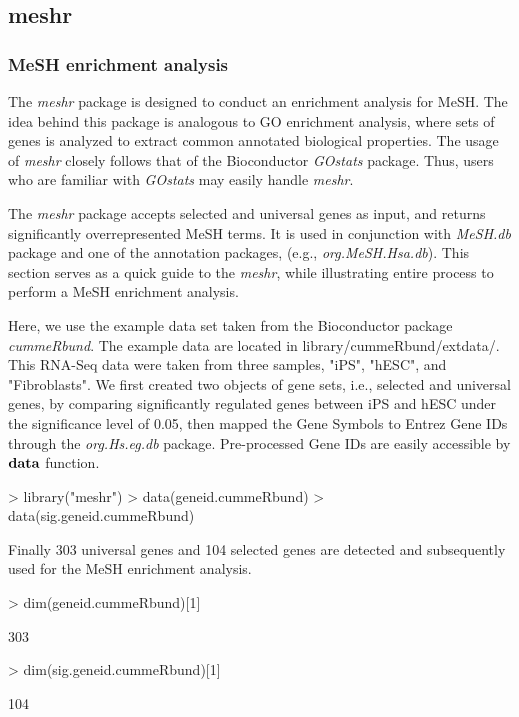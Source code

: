 \documentclass[11pt]{article}
\newcommand{\Rpackage}[1]{{\textit{#1}}}
\begin{document}
\clearpage
\subsection{meshr}
\subsubsection{MeSH enrichment analysis}
The \Rpackage{meshr} package is designed to conduct an enrichment analysis for MeSH.  The idea behind this package is analogous to GO enrichment analysis, where sets of genes is analyzed to extract common annotated biological properties. The usage of \Rpackage{meshr} closely follows that of the Bioconductor \Rpackage{GOstats} package. Thus, users who are familiar with \Rpackage{GOstats} may easily handle \Rpackage{meshr}.

The \Rpackage{meshr} package accepts selected and universal genes as input, and returns significantly overrepresented MeSH terms. It is used in conjunction with \Rpackage{MeSH.db} package and one of the annotation packages, (e.g., \Rpackage{org.MeSH.Hsa.db}). This section serves as a quick guide to the \Rpackage{meshr}, while illustrating entire process to perform a MeSH enrichment analysis.

Here, we use the example data set taken from the Bioconductor package \Rpackage{cummeRbund}. The example data are located in library/cummeRbund/extdata/. This RNA-Seq data were taken from three samples, "iPS", "hESC", and  "Fibroblasts".
We first created two objects of gene sets, i.e., selected and universal genes,
by comparing significantly regulated genes between iPS and hESC under the significance level of 0.05, then mapped the Gene Symbols to Entrez Gene IDs through the \Rpackage{org.Hs.eg.db} package. Pre-processed Gene IDs are easily accessible by $\bf{data}$ function.

\begin{center}
\begin{Schunk}
\begin{Sinput}
> library("meshr")
> data(geneid.cummeRbund)
> data(sig.geneid.cummeRbund)
\end{Sinput}
\end{Schunk}
\end{center}

Finally 303 universal genes and 104 selected genes are detected and subsequently
used for the MeSH enrichment analysis.

\begin{center}
\begin{Schunk}
\begin{Sinput}
> dim(geneid.cummeRbund)[1]
\end{Sinput}
\begin{Soutput}
[1] 303
\end{Soutput}
\begin{Sinput}
> dim(sig.geneid.cummeRbund)[1]
\end{Sinput}
\begin{Soutput}
[1] 104
\end{Soutput}
\end{Schunk}
\end{center}
\end{document}
